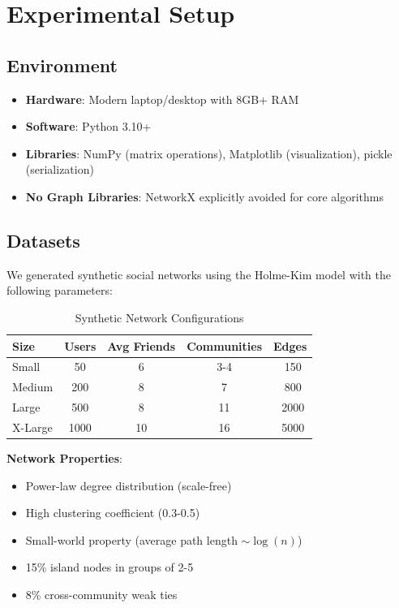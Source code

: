 \documentclass[12pt,a4paper]{article}
\begin{document}
\section{Experimental Setup}

\subsection{Environment}
\begin{itemize}
    \item \textbf{Hardware}: Modern laptop/desktop with 8GB+ RAM
    \item \textbf{Software}: Python 3.10+
    \item \textbf{Libraries}: NumPy (matrix operations), Matplotlib (visualization), pickle (serialization)
    \item \textbf{No Graph Libraries}: NetworkX explicitly avoided for core algorithms
\end{itemize}

\subsection{Datasets}
We generated synthetic social networks using the Holme-Kim model with the following parameters:

\begin{table}[h]
\centering
\begin{tabular}{@{}lcccc@{}}
\toprule
\textbf{Size} & \textbf{Users} & \textbf{Avg Friends} & \textbf{Communities} & \textbf{Edges} \\
\midrule
Small & 50 & 6 & 3-4 & ~150 \\
Medium & 200 & 8 & 7 & ~800 \\
Large & 500 & 8 & 11 & ~2000 \\
X-Large & 1000 & 10 & 16 & ~5000 \\
\bottomrule
\end{tabular}
\caption{Synthetic Network Configurations}
\end{table}

\textbf{Network Properties}:
\begin{itemize}
    \item Power-law degree distribution (scale-free)
    \item High clustering coefficient (0.3-0.5)
    \item Small-world property (average path length $\sim \log(n)$)
    \item 15\% island nodes in groups of 2-5
    \item 8\% cross-community weak ties
\end{itemize}
\end{document}
